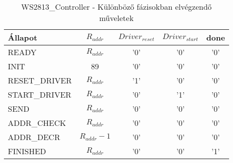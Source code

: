 \begin{table}[H]
	\begin{center}
		\caption{WS2813\_Controller - Különböző fázisokban elvégzendő műveletek}
		\begin{tabular}{l|c|c|c|c}
		\textbf{Állapot} & $R_{addr}$ 	  & $Driver_{reset}$     & $Driver_{start}$      & done \\
		\hline         
        READY            & $R_{addr}$ 	  & '0'                  & '0'                   & '0'  \\
        \hline         
        INIT             & 89       	  & '0'                  & '0'                   & '0'  \\
        \hline         
        RESET\_DRIVER    & $R_{addr}$  	  & '1'                  & '0'                   & '0'  \\
        \hline         
        START\_DRIVER    & $R_{addr}$  	  & '0'                  & '1'                   & '0'  \\
        \hline         
        SEND             & $R_{addr}$  	  & '0'                  & '0'                   & '0'  \\
        \hline         
		ADDR\_CHECK      & $R_{addr}$     & '0'                  & '0'                   & '0'  \\
        \hline         
        ADDR\_DECR       & $R_{addr} - 1$ & '0'                  & '0'                   & '0'  \\
        \hline         
        FINISHED         & $R_{addr}$     & '0'                  & '0'                   & '1'  \\
		\end{tabular}
	\end{center}
\end{table}